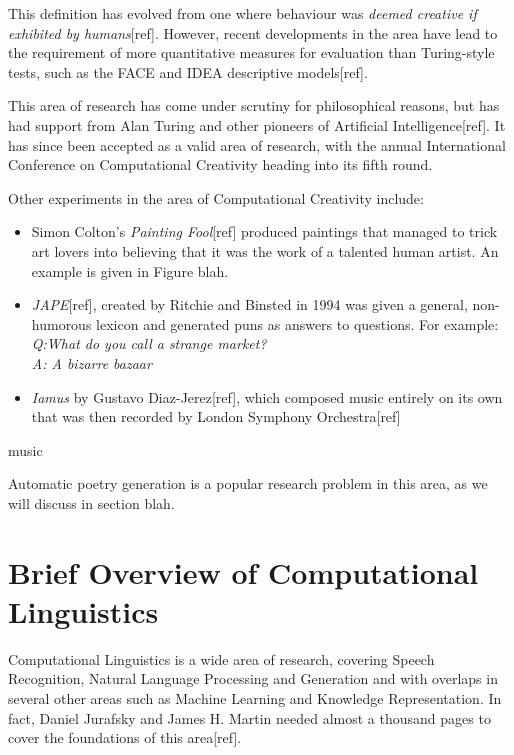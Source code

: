 This definition has evolved from one where behaviour was \textit{deemed creative if exhibited by humans}[ref]. However, recent developments in the area have lead to the requirement of more quantitative measures for evaluation than Turing-style tests, such as the FACE and IDEA descriptive models[ref].

This area of research has come under scrutiny for philosophical reasons, but has had support from Alan Turing and other pioneers of Artificial Intelligence[ref]. It has since been accepted as a valid area of research, with the annual International Conference on Computational Creativity heading into its fifth round.

Other experiments in the area of Computational Creativity include:
\begin{itemize}
\item{Simon Colton's \textit{Painting Fool}[ref] produced paintings that managed to trick art lovers into believing that it was the work of a talented human artist. An example is given in Figure blah.}
\item{\textit{JAPE}[ref], created by Ritchie and Binsted in 1994 was given a general, non-humorous lexicon and generated puns as answers to questions. For example:\\\textit{Q:What do you call a strange market?\\ A: A bizarre bazaar}}
\item{\textit{Iamus} by Gustavo Diaz-Jerez[ref], which composed music entirely on its own that was then recorded by London Symphony Orchestra[ref]}
\end{itemize} 
music

Automatic poetry generation is a popular research problem in this area, as we will discuss in section blah.

\section{Brief Overview of Computational Linguistics}
Computational Linguistics is a wide area of research, covering Speech Recognition, Natural Language Processing and Generation and with overlaps in several other areas such as Machine Learning and Knowledge Representation. In fact, Daniel Jurafsky and James H. Martin needed almost a thousand pages to cover the foundations of this area[ref].

